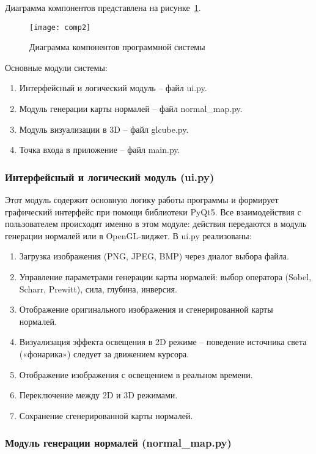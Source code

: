 Диаграмма компонентов представлена на рисунке~\ref{comp2:image}.

\begin{figure}[ht]
	\texttt{[image: comp2]}
	\caption{Диаграмма компонентов программной системы}
	\label{comp2:image}
\end{figure}

Основные модули системы:

\begin{enumerate}
	\item Интерфейсный и логический модуль -- файл ui.py.
	\item Модуль генерации карты нормалей -- файл normal\_map.py.
	\item Модуль визуализации в 3D -- файл glcube.py.
	\item Точка входа в приложение -- файл main.py.
\end{enumerate}

\subsubsection{Интерфейсный и логический модуль (ui.py)}

Этот модуль содержит основную логику работы программы и формирует графический интерфейс при помощи библиотеки PyQt5. Все взаимодействия с пользователем происходят именно в этом модуле: действия передаются в модуль генерации нормалей или в OpenGL-виджет. В ui.py реализованы:

\begin{enumerate}
	\item Загрузка изображения (PNG, JPEG, BMP) через диалог выбора файла.
	\item Управление параметрами генерации карты нормалей: выбор оператора (Sobel, Scharr, Prewitt), сила, глубина, инверсия.
	\item Отображение оригинального изображения и сгенерированной карты нормалей.
	\item Визуализация эффекта освещения в 2D режиме -- поведение источника света («фонарика») следует за движением курсора.
	\item Отображение изображения с освещением в реальном времени.
	\item Переключение между 2D и 3D режимами.
	\item Сохранение сгенерированной карты нормалей.
\end{enumerate}

\subsubsection{Модуль генерации нормалей (normal\_map.py)}

